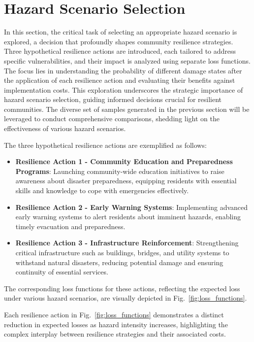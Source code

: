 \section{Hazard Scenario Selection}
    In this section, the critical task of selecting an appropriate hazard scenario is explored, a decision that profoundly shapes community resilience strategies. Three hypothetical resilience actions are introduced, each tailored to address specific vulnerabilities, and their impact is analyzed using separate loss functions. The focus lies in understanding the probability of different damage states after the application of each resilience action and evaluating their benefits against implementation costs. This exploration underscores the strategic importance of hazard scenario selection, guiding informed decisions crucial for resilient communities. The diverse set of samples generated in the previous section will be leveraged to conduct comprehensive comparisons, shedding light on the effectiveness of various hazard scenarios.

    The three hypothetical resilience actions are exemplified as follows:
    \begin{itemize}
        \item \textbf{Resilience Action 1 - Community Education and Preparedness Programs}: Launching community-wide education initiatives to raise awareness about disaster preparedness, equipping residents with essential skills and knowledge to cope with emergencies effectively.
        \item \textbf{Resilience Action 2 - Early Warning Systems}: Implementing advanced early warning systems to alert residents about imminent hazards, enabling timely evacuation and preparedness.
        \item \textbf{Resilience Action 3 - Infrastructure Reinforcement}: Strengthening critical infrastructure such as buildings, bridges, and utility systems to withstand natural disasters, reducing potential damage and ensuring continuity of essential services.
    \end{itemize}

    The corresponding loss functions for these actions, reflecting the expected loss under various hazard scenarios, are visually depicted in Fig.~\ref{fig:loss_functions}.

    
    
    Each resilience action in Fig.~\ref{fig:loss_functions} demonstrates a distinct reduction in expected losses as hazard intensity increases, highlighting the complex interplay between resilience strategies and their associated costs.

